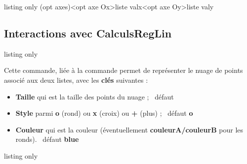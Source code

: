 \documentclass[a4paper,french,11pt]{article}
\newcommand\ctex[1]{\tcbox[vignettelatex]{#1}}
\newcommand\Cle[1]{{\bfseries\sffamily\textlangle #1\textrangle}}
\begin{document}
\begin{PresCodeTexPL}{listing only}
	\FenetreTikz %
	\FenetreSimpleTikz[opt](opt axes)<opt axe Ox>{liste valx}<opt axe Oy>{liste valy}
\end{PresCodeTexPL}

\subsection{Interactions avec CalculsRegLin}

\begin{PresCodeTexPL}{listing only}
\end{PresCodeTexPL}

\begin{cautionblock}
Cette commande, liée à la commande \ctex{CalculsRegLin} permet de représenter le nuage de points associé aux deux listes, avec les \Cle{clés} suivantes :

\begin{itemize}
	\item \Cle{Taille} qui est la taille des points du nuage ; \hfill~défaut \Cle{2pt}
	\item \Cle{Style} parmi \Cle{o} (rond) ou \Cle{x} (croix) ou \Cle{+} (plus) ; \hfill~défaut \Cle{o}
	\item \Cle{Couleur} qui est la couleur (éventuellement \Cle{couleurA/couleurB} pour les ronds). \hfill~défaut \Cle{blue}
\end{itemize}
\vspace*{-\baselineskip}\leavevmode
\end{cautionblock}

\begin{PresCodeTexPL}{listing only}
\def\LLX{1994,1995,1996,1997,1998,1999,2000,2001,2002,2004,2005,2006,2007,2008, 2009,2010}
\def\LLY{1718,1710,1708,1700,1698,1697,1691,1688,1683,1679,1671,1670,1663,1661, 1656,1649}

\begin{tikzpicture}[...]
	\NuagePointsTikz[Couleur=blue/red]{\LLX}{\LLY}
\end{tikzpicture}
~~
\begin{tikzpicture}[...]
	\NuagePointsTikz[Couleur=ForestGreen,Style=x,Taille=6pt]{\LLX}{\LLY}
\end{tikzpicture}
\end{PresCodeTexPL}
\end{document}
